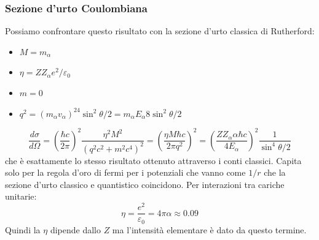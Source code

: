 \subsubsection{Sezione d'urto Coulombiana}
Possiamo confrontare questo risultato con la sezione d'urto classica di Rutherford:
\begin{itemize}
    \item $M=m_\alpha$
    \item $\eta=ZZ_\alpha e^2/\varepsilon_0$
    \item $m=0$
    \item $q^2=(m_\alpha v_\alpha)^24\sin^2{\theta/2}=m_\alpha E_\alpha8\sin^2{\theta/2}$
\end{itemize}
\begin{equation*}
    \frac{d\sigma}{d\Omega}=\left(\frac{\hbar c}{2\pi}\right)^2\frac{\eta^2M^2}{(q^2c^2+m^2c^4)^2}=\left(\frac{\eta M\hbar c}{2\pi q^2}\right)^2=\left(\frac{ZZ_\alpha \alpha \hbar c}{4E_\alpha}\right)^2\frac{1}{\sin^4{\theta/2}}
\end{equation*}
che è esattamente lo stesso risultato ottenuto attraverso i conti classici. Capita solo per la regola d'oro di fermi per i potenziali che vanno come $1/r$ che la sezione d'urto classico e quantistico coincidono. Per interazioni tra cariche unitarie:
\begin{equation*}
    \eta=\frac{e^2}{\varepsilon_0}=4\pi\alpha\approx0.09
\end{equation*}
Quindi la $\eta$ dipende dallo $Z$ ma l'intensità elementare è dato da questo termine.
